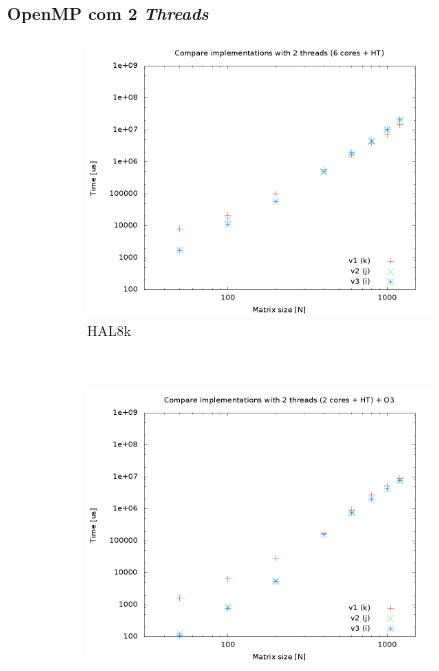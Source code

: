 \documentclass[a4paper, 12pt]{article}
\begin{document}
\newpage
\subsubsection{OpenMP com 2 \textit{Threads}}
\begin{figure}[H]
    \centering
    \begin{subfigure}[H]{0.5\textwidth}
        \includegraphics[width=\textwidth]{HAL_cmp_versions-2t}
        \caption{HAL8k}
        \label{fig:8k_cmp_2t}
    \end{subfigure}%
    ~ %
    \begin{subfigure}[H]{0.5\textwidth}
        \includegraphics[width=\textwidth]{hpops2_O3_cmp_versions-2t}

\end{subfigure}
\end{figure}
\end{document}
